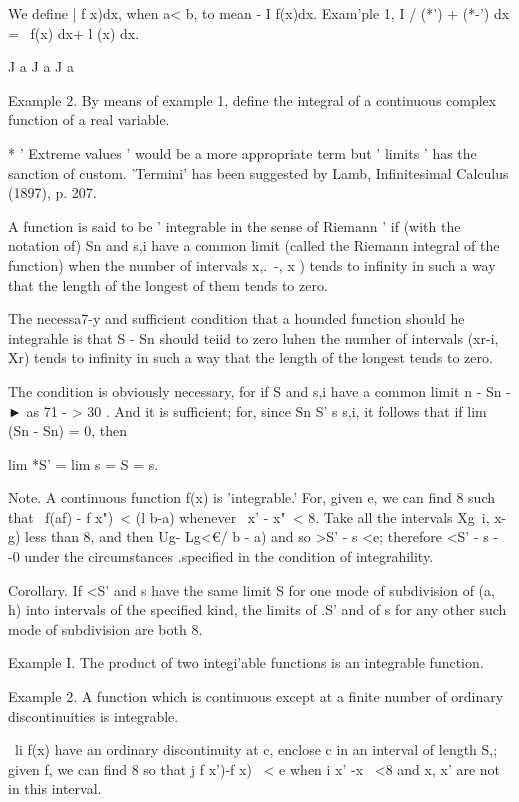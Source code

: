 We define | f x)dx, when a< b, to mean - I f(x)dx. Exam'ple 1, I /
(*') + (*-') dx = \ f(x) dx+ l (x) dx.

J a J a J a

Example 2. By means of example 1, define the integral of a continuous
complex function of a real variable.

* ' Extreme values ' would be a more appropriate term but ' limits '
has the sanction of custom. 'Termini' has been suggested by Lamb,
Infinitesimal Calculus (1897), p. 207.

%
%


A function is said to be ' integrable in the sense of Riemann ' if
(with the notation of) Sn and s,i have a common limit (called
the Riemann integral of the function) when the number of intervals
x,.\ -, x ) tends to infinity in such a way that the length of the
longest of them tends to zero.

The necessa7-y and sufficient condition that a hounded function should
he integrahle is that S - Sn should teiid to zero luhen the numher of
intervals (xr-i, Xr) tends to infinity in such a way that the length
of the longest tends to zero.

The condition is obviously necessary, for if S and s,i have a common
limit n - Sn - ► as 71 - > 30 . And it is sufficient; for, since Sn
S' s s,i, it follows that if lim (Sn - Sn) = 0, then

lim *S' = lim s = S = s.

Note. A continuous function f(x) is 'integrable.' For, given e, we can
find 8 such that \ f(af) - f x")\ < (l b-a) whenever \ x' - x"\ < 8.
Take all the intervals Xg\ i, x-g) less than 8, and then Ug- Lg<€/ b -
a) and so >S' - s <e; therefore <S' - s - -0 under the circumstances
.specified in the condition of integrahility.

Corollary. If <S' and s have the same limit S for one mode of
subdivision of (a, h) into intervals of the specified kind, the limits
of .S' and of s for any other such mode of subdivision are both 8.

Example I. The product of two integi'able functions is an integrable
function.

Example 2. A function which is continuous except at a finite number of
ordinary discontinuities is integrable.

\ li f(x) have an ordinary discontinuity at c, enclose c in an
interval of length S,; given f, we can find 8 so that j f x')-f x) \
< e when i x' -x \ <8 and x, x' are not in this interval.

